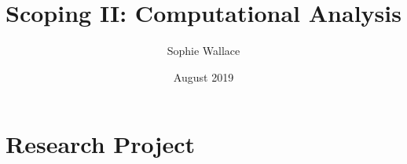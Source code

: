 \documentclass{article}
\title{Scoping II: Computational Analysis}
\author{Sophie Wallace }
\date{August 2019}
\begin{document}
\maketitle

\section{Research Project}
\end{document}
